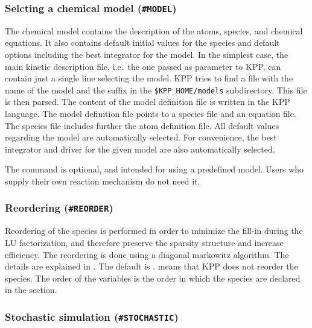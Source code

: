 \documentclass[twoside]{article}
\begin{document}
\subsubsection{Selcting a chemical model ({\tt\#MODEL})}
\label{sec:command-model}

The chemical model contains the description of the atoms, species, and
chemical equations. It also contains default initial values for the
species and default options including the best integrator for the model.
In the simplest case, the main kinetic description file, i.e.\ the one
passed as parameter to KPP, can contain just a single line selecting the
model. KPP tries to find a file with the name of the model and the
suffix  in the \verb|$KPP_HOME/models| subdirectory. This
file is then parsed. The content of the model definition file is written
in the KPP language. The model definition file points to a species file
and an equation file. The species file includes further the atom
definition file. All default values regarding the model are
automatically selected. For convenience, the best integrator and driver
for the given model are also automatically selected. %

The  command is optional, and intended for using a
predefined model. Users who supply their own reaction mechanism do not
need it.

\subsubsection{Reordering ({\tt\#REORDER})}
\label{sec:command-reorder}

Reordering of the species is performed in order to minimize the fill-in
during the LU factorization, and therefore preserve the sparsity
structure and increase efficiency.  The reordering is done using a
diagonal markowitz algorithm. The details are explained in
\citet{IMPLEMENTATION}. The default is .  means that
KPP does not reorder the species. The order of the variables is the
order in which the species are declared in the  section.

\subsubsection{Stochastic simulation ({\tt\#STOCHASTIC})}
\label{sec:command-stochastic}
\end{document}
